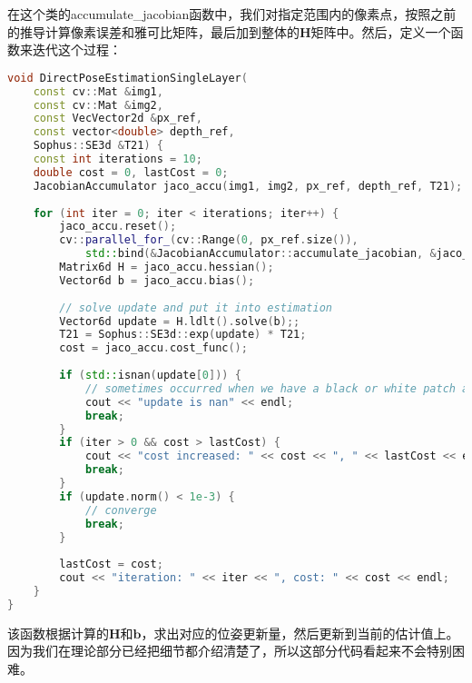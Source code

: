 在这个类的accumulate\_jacobian函数中，我们对指定范围内的像素点，按照之前的推导计算像素误差和雅可比矩阵，最后加到整体的$\bm{H}$矩阵中。然后，定义一个函数来迭代这个过程：
\begin{lstlisting}[language=c++,caption=slambook2/ch8/direct_method.cpp（片段）]
void DirectPoseEstimationSingleLayer(
	const cv::Mat &img1,
	const cv::Mat &img2,
	const VecVector2d &px_ref,
	const vector<double> depth_ref,
	Sophus::SE3d &T21) {
	const int iterations = 10;
	double cost = 0, lastCost = 0;
	JacobianAccumulator jaco_accu(img1, img2, px_ref, depth_ref, T21);
	
	for (int iter = 0; iter < iterations; iter++) {
		jaco_accu.reset();
		cv::parallel_for_(cv::Range(0, px_ref.size()),
			std::bind(&JacobianAccumulator::accumulate_jacobian, &jaco_accu, std::placeholders::_1));
		Matrix6d H = jaco_accu.hessian();
		Vector6d b = jaco_accu.bias();
		
		// solve update and put it into estimation
		Vector6d update = H.ldlt().solve(b);;
		T21 = Sophus::SE3d::exp(update) * T21;
		cost = jaco_accu.cost_func();
		
		if (std::isnan(update[0])) {
			// sometimes occurred when we have a black or white patch and H is irreversible
			cout << "update is nan" << endl;
			break;
		}
		if (iter > 0 && cost > lastCost) {
			cout << "cost increased: " << cost << ", " << lastCost << endl;
			break;
		}
		if (update.norm() < 1e-3) {
			// converge
			break;
		}
		
		lastCost = cost;
		cout << "iteration: " << iter << ", cost: " << cost << endl;
	}
}
\end{lstlisting}
该函数根据计算的$\bm{H}$和$\bm{b}$，求出对应的位姿更新量，然后更新到当前的估计值上。因为我们在理论部分已经把细节都介绍清楚了，所以这部分代码看起来不会特别困难。

